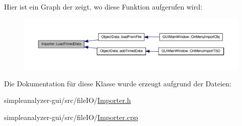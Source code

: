 Hier ist ein Graph der zeigt, wo diese Funktion aufgerufen wird\-:\nopagebreak
\begin{figure}[H]
\begin{center}
\leavevmode
\includegraphics[width=350pt]{classImporter_a196e66a161a0102194580ec4b10895e5_icgraph}
\end{center}
\end{figure}




Die Dokumentation für diese Klasse wurde erzeugt aufgrund der Dateien\-:\begin{DoxyCompactItemize}
\item 
simpleanalyzer-\/gui/src/file\-I\-O/\hyperlink{Importer_8h}{Importer.\-h}\item 
simpleanalyzer-\/gui/src/file\-I\-O/\hyperlink{Importer_8cpp}{Importer.\-cpp}\end{DoxyCompactItemize}
